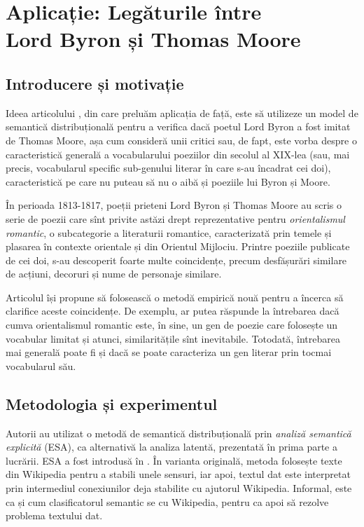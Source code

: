 
\chapter{Aplicație: Legăturile între \\ Lord Byron și Thomas Moore}

\section{Introducere și motivație}

Ideea articolului \cite{agg}, din care preluăm aplicația de față, este să
utilizeze un model de semantică distribuțională pentru a verifica dacă
poetul Lord Byron a fost imitat de Thomas Moore, așa cum consideră unii
critici sau, de fapt, este vorba despre o caracteristică generală a
vocabularului poeziilor din secolul al XIX-lea (sau, mai precis, vocabularul
specific sub-genului literar în care s-au încadrat cei doi),
caracteristică pe care nu puteau să nu o aibă și poeziile lui Byron și Moore.

În perioada 1813-1817, poeții prieteni Lord Byron și Thomas Moore au
scris o serie de poezii care sînt privite astăzi drept reprezentative
pentru \emph{orientalismul romantic}, o subcategorie a literaturii romantice,
caracterizată prin temele și plasarea în contexte orientale și din
Orientul Mijlociu. Printre poeziile publicate de cei doi, s-au descoperit
foarte multe coincidențe, precum desfășurări similare de acțiuni, decoruri și
nume de personaje similare.

Articolul \cite{agg} își propune să folosească o metodă empirică nouă
pentru a încerca să clarifice aceste coincidențe. De exemplu, ar putea
răspunde la întrebarea dacă cumva orientalismul romantic este, în sine,
un gen de poezie care folosește un vocabular limitat și atunci, similaritățile
sînt inevitabile. Totodată, întrebarea mai generală poate fi și dacă se poate
caracteriza un gen literar prin tocmai vocabularul său.

\section{Metodologia și experimentul}

Autorii au utilizat o metodă de semantică distribuțională prin \emph{analiză %
  semantică explicită} (ESA), ca alternativă la analiza latentă, prezentată
în prima parte a lucrării. ESA a fost introdusă în \cite{esa}. În varianta
originală, metoda folosește texte din Wikipedia pentru a stabili unele sensuri,
iar apoi, textul dat este interpretat prin intermediul conexiunilor deja
stabilite cu ajutorul Wikipedia. Informal, este ca și cum clasificatorul
semantic se  cu Wikipedia, pentru ca apoi să rezolve problema
textului dat.

